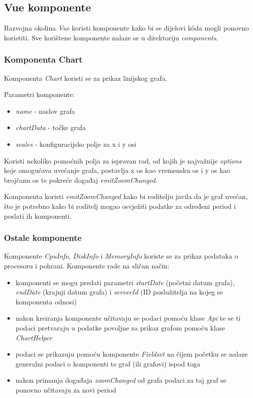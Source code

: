 \documentclass[zavrsnirad]{fer}
\begin{document}
\subsection{Vue komponente}
Razvojna okolina \textit{Vue} koristi komponente kako bi se dijelovi kôda mogli ponovno koristiti. Sve korištene komponente nalaze se u direktoriju \textit{components}.

\subsubsection{Komponenta Chart}
Komponenta \textit{Chart} koristi se za prikaz linijskog grafa.

Parametri komponente:
\begin{itemize}
	\item \textit{name} - naslov grafa
	\item \textit{chartData} - točke grafa
	\item \textit{scales} - konfiguracijsko polje za x i y osi
\end{itemize}
Koristi nekoliko pomoćnih polja za ispravan rad, od kojih je najvažnije  \textit{options} koje omogućava uvećanje grafa, postavlja x os kao vremensku os i y os kao brojčanu os  te pokreće događaj \textit{emitZoomChanged}.

Komponenta koristi \textit{emitZoomChanged}  kako bi roditelju javila da je graf uvećan, što je potrebno kako bi roditelj mogao osvježiti podatke za određeni period i poslati ih komponenti.


\subsubsection{Ostale komponente}
Komponente \textit{CpuInfo}, \textit{DiskInfo} i \textit{MemoryInfo} koriste se za prikaz podataka o procesoru i pohrani. Komponente rade na sličan način:
\begin{itemize}
	\item komponenti se mogu predati parametri \textit{startDate} (početni datum grafa), \textit{endDate} (krajnji datum grafa) i \textit{serverId} (ID poslužitelja na kojeg se komponenta odnosi)
	\item nakon kreiranja komponente učitavaju se podaci pomoću klase \textit{Api} te se ti podaci pretvaraju u podatke povoljne za prikaz grafom pomoću klase \textit{ChartHelper}
	\item podaci se prikazuju pomoću komponente \textit{Fieldset} na čijem početku se nalaze generalni podaci o komponenti te graf (ili grafovi) ispod toga
	\item nakon primanja događaja \textit{zoomChanged} od grafa podaci za taj graf se ponovno učitavaju za novi period
\end{itemize}
\end{document}
